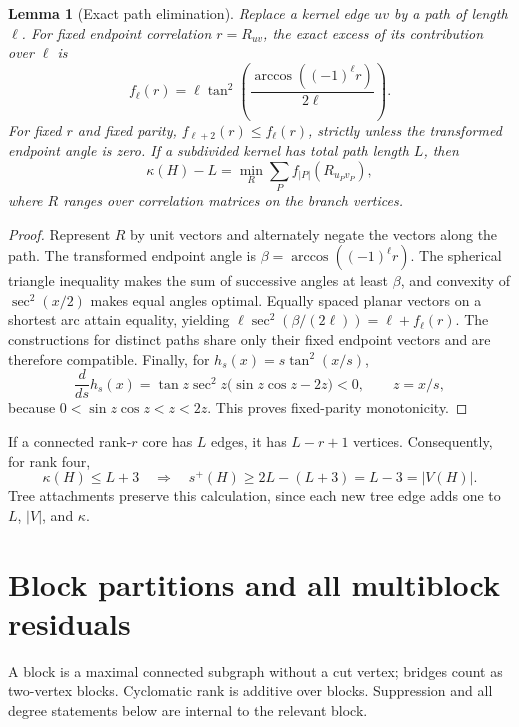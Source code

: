 \documentclass[11pt]{article}
\newtheorem{lemma}[theorem]{Lemma}
\theoremstyle{remark}
\newcommand{\splus}{s^+}
\newcommand{\kap}{\kappa}
\begin{document}
\begin{lemma}[Exact path elimination]\label{lem:path}
Replace a kernel edge $uv$ by a path of length $\ell$.  For fixed endpoint
correlation $r=R_{uv}$, the exact excess of its contribution over $\ell$ is
\begin{equation}\label{eq:path-cost}
 f_\ell(r)=\ell\tan^2\!\left(
 \frac{\arccos((-1)^\ell r)}{2\ell}\right).
\end{equation}
For fixed $r$ and fixed parity, $f_{\ell+2}(r)\leq f_\ell(r)$, strictly unless
the transformed endpoint angle is zero.  If a subdivided kernel has total path
length $L$, then
\begin{equation}\label{eq:kernel-min}
 \kap(H)-L=\min_R\sum_{P}f_{|P|}(R_{u_Pv_P}),
\end{equation}
where $R$ ranges over correlation matrices on the branch vertices.
\end{lemma}

\begin{proof}
Represent $R$ by unit vectors and alternately negate the vectors along the
path.  The transformed endpoint angle is
$\beta=\arccos((-1)^\ell r)$.  The spherical triangle inequality makes the
sum of successive angles at least $\beta$, and convexity of
$\sec^2(x/2)$ makes equal angles optimal.  Equally spaced planar vectors on a
shortest arc attain equality, yielding
$\ell\sec^2(\beta/(2\ell))=\ell+f_\ell(r)$.  The constructions for distinct
paths share only their fixed endpoint vectors and are therefore compatible.
Finally, for $h_s(x)=s\tan^2(x/s)$,
\[
 \frac{d}{ds}h_s(x)=
 \tan z\sec^2z\bigl(\sin z\cos z-2z\bigr)<0,
 \qquad z=x/s,
\]
because $0<\sin z\cos z<z<2z$.  This proves fixed-parity monotonicity.
\end{proof}

If a connected rank-$r$ core has $L$ edges, it has $L-r+1$ vertices.
Consequently, for rank four,
\begin{equation}\label{eq:budget}
 \kap(H)\leq L+3
 \quad\Longrightarrow\quad
 \splus(H)\geq2L-(L+3)=L-3=|V(H)|.
\end{equation}
Tree attachments preserve this calculation, since each new tree edge adds one
to $L$, $|V|$, and $\kap$.

\section{Block partitions and all multiblock residuals}

A block is a maximal connected subgraph without a cut vertex; bridges count
as two-vertex blocks.  Cyclomatic rank is additive over blocks.  Suppression
and all degree statements below are internal to the relevant block.
\end{document}

